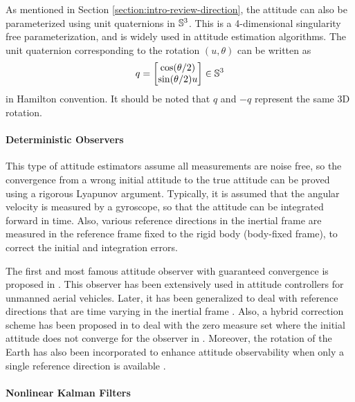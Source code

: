 As mentioned in Section \ref{section:intro-review-direction}, the attitude can also be parameterized using unit quaternions in $\mathbb{S}^3$.
This is a 4-dimensional singularity free parameterization, and is widely used in attitude estimation algorithms.
The unit quaternion corresponding to the rotation $(u,\theta)$ can be written as
\begin{align} \label{eqn:rv2qua}
	q = \begin{bmatrix} \cos(\theta/2) \\ \sin(\theta/2) u \end{bmatrix} \in \mathbb{S}^3
\end{align}
in Hamilton convention.
It should be noted that $q$ and $-q$ represent the same 3D rotation.

\paragraph{Deterministic Observers}

This type of attitude estimators assume all measurements are noise free, so the convergence from a wrong initial attitude to the true attitude can be proved using a rigorous Lyapunov argument.
Typically, it is assumed that the angular velocity is measured by a gyroscope, so that the attitude can be integrated forward in time.
Also, various reference directions in the inertial frame are measured in the reference frame fixed to the rigid body (body-fixed frame), to correct the initial and integration errors.

The first and most famous attitude observer with guaranteed convergence is proposed in \cite{mahony2008nonlinear}.
This observer has been extensively used in attitude controllers for unmanned aerial vehicles.
Later, it has been generalized to deal with reference directions that are time varying in the inertial frame \cite{batista2012ges,grip2011attitude,trumpf2012analysis}.
Also, a hybrid correction scheme has been proposed in \cite{wu2015globally} to deal with the zero measure set where the initial attitude does not converge for the observer in \cite{mahony2008nonlinear}.
Moreover, the rotation of the Earth has also been incorporated to enhance attitude observability when only a single reference direction is available \cite{reis2018nonlinear}.

\paragraph{Nonlinear Kalman Filters}

